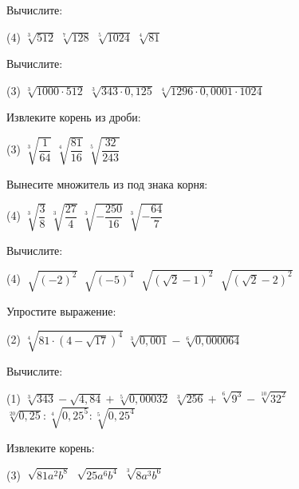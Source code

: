 \begin{class}[number=2]
	\begin{listofex}
		\item Вычислите:
		\begin{tasks}(4)
			\task \( \sqrt[3]{512} \)
			\task \( \sqrt[7]{128} \)
			\task \( \sqrt[5]{1024} \)
			\task \( \sqrt[4]{81} \)
		\end{tasks}
		\item Вычислите:
		\begin{tasks}(3)
			\task \( \sqrt[3]{1000 \cdot 512} \)
			\task \( \sqrt[3]{343 \cdot 0,125} \)
			\task \( \sqrt[4]{1296 \cdot 0,0001 \cdot 1024} \)
		\end{tasks}
		\item Извлеките корень из дроби:
		\begin{tasks}(3)
			\task \( \sqrt[3]{\dfrac{1}{64}} \)
			\task \( \sqrt[4]{\dfrac{81}{16}} \)
			\task \( \sqrt[5]{\dfrac{32}{243}} \)
		\end{tasks}
		\item Вынесите множитель из под знака корня:
		\begin{tasks}(4)
			\task \( \sqrt[3]{\dfrac{3}{8}} \)
			\task \( \sqrt[3]{\dfrac{27}{4}} \)
			\task \( \sqrt[3]{-\dfrac{250}{16}} \)
			\task \( \sqrt[3]{-\dfrac{64}{7}} \)
		\end{tasks}
		\item Вычислите:
		\begin{tasks}(4)
			\task \( \sqrt[]{(-2)^2} \)
			\task \( \sqrt[]{(-5)^4} \)
			\task \( \sqrt[]{(\sqrt{2}-1)^2} \)
			\task \( \sqrt[]{(\sqrt{2}-2)^2} \)
		\end{tasks}
		\item Упростите выражение:
		\begin{tasks}(2)
			\task \( \sqrt[4]{81 \cdot (4-\sqrt{17})^4} \)
			\task \( \sqrt[3]{0,001} - \sqrt[6]{0,000064} \)
		\end{tasks}
		\item Вычислите:
		\begin{tasks}(1)
			\task \( \sqrt[3]{343} - \sqrt{4,84}+ \sqrt[5]{0,00032} \)
			\task \( \sqrt[3]{256} + \sqrt[6]{9^3} - \sqrt[10]{32^2} \)
			\task \( \sqrt[20]{0,25} : \sqrt[4]{0,25^5} : \sqrt[5]{0,25^4} \)
		\end{tasks}
		\item Извлеките корень:
		\begin{tasks}(3)
			\task \( \sqrt[]{ 81a^2b^8 } \)
			\task \( \sqrt[]{ 25a^6b^4 } \)
			\task \( \sqrt[3]{ 8a^3b^6 } \)

\end{tasks}
\end{listofex}
\end{class}
